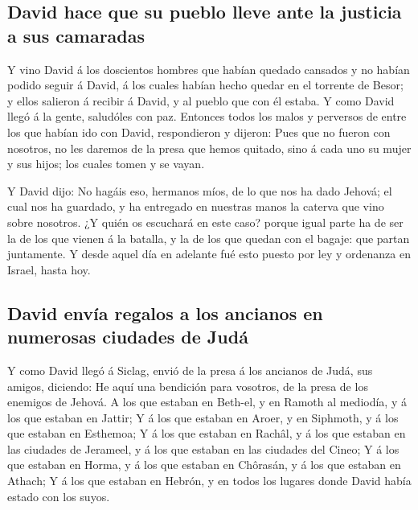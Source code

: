 \hypertarget{david-hace-que-su-pueblo-lleve-ante-la-justicia-a-sus-camaradas}{%
\subsection{David hace que su pueblo lleve ante la justicia a sus
camaradas}\label{david-hace-que-su-pueblo-lleve-ante-la-justicia-a-sus-camaradas}}

 Y vino David á los doscientos hombres que habían quedado
cansados y no habían podido seguir á David, á los cuales habían hecho
quedar en el torrente de Besor; y ellos salieron á recibir á David, y al
pueblo que con él estaba. Y como David llegó á la gente, saludóles con
paz.  Entonces todos los malos y perversos de entre los
que habían ido con David, respondieron y dijeron: Pues que no fueron con
nosotros, no les daremos de la presa que hemos quitado, sino á cada uno
su mujer y sus hijos; los cuales tomen y se vayan.

 Y David dijo: No hagáis eso, hermanos míos, de lo que
nos ha dado Jehová; el cual nos ha guardado, y ha entregado en nuestras
manos la caterva que vino sobre nosotros.  ¿Y quién os
escuchará en este caso? porque igual parte ha de ser la de los que
vienen á la batalla, y la de los que quedan con el bagaje: que partan
juntamente.  Y desde aquel día en adelante fué esto
puesto por ley y ordenanza en Israel, hasta hoy.

\hypertarget{david-envuxeda-regalos-a-los-ancianos-en-numerosas-ciudades-de-juduxe1}{%
\subsection{David envía regalos a los ancianos en numerosas ciudades de
Judá}\label{david-envuxeda-regalos-a-los-ancianos-en-numerosas-ciudades-de-juduxe1}}

 Y como David llegó á Siclag, envió de la presa á los
ancianos de Judá, sus amigos, diciendo: He aquí una bendición para
vosotros, de la presa de los enemigos de Jehová.  A los
que estaban en Beth-el, y en Ramoth al mediodía, y á los que estaban en
Jattir;  Y á los que estaban en Aroer, y en Siphmoth, y á
los que estaban en Esthemoa;  Y á los que estaban en
Rachâl, y á los que estaban en las ciudades de Jerameel, y á los que
estaban en las ciudades del Cineo;  Y á los que estaban
en Horma, y á los que estaban en Chôrasán, y á los que estaban en
Athach;  Y á los que estaban en Hebrón, y en todos los
lugares donde David había estado con los suyos.


